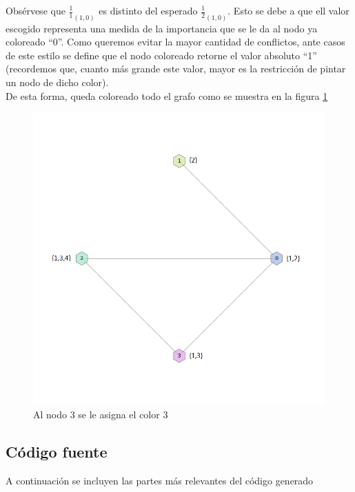 Obsérvese que $\frac{1}{1}_{(1,0)}$ es distinto del esperado $\frac{1}{2}_{(1,0)}$. Esto se debe a que ell valor escogido representa una medida de la importancia que se le da al nodo ya coloreado ``0''. Como queremos evitar la mayor cantidad de conflictos, ante casos de este estilo se define que el nodo coloreado retorne el valor absoluto ``1'' (recordemos que, cuanto más grande este valor, mayor es la restricción de pintar un nodo de dicho color).\\

De esta forma, queda coloreado todo el grafo como se muestra en la figura \ref{4colores}

 \begin{figure}[H]
    \begin{center}
  	\includegraphics[width=13cm]{imagenes/ej3/4Nodos4.png}
 	\caption{Al nodo 3 se le asigna el color 3}
 	\label{4colores}
    \end{center}
  \end{figure}


\subsection{Código fuente}

A continuación se incluyen las partes más relevantes del código generado\\

